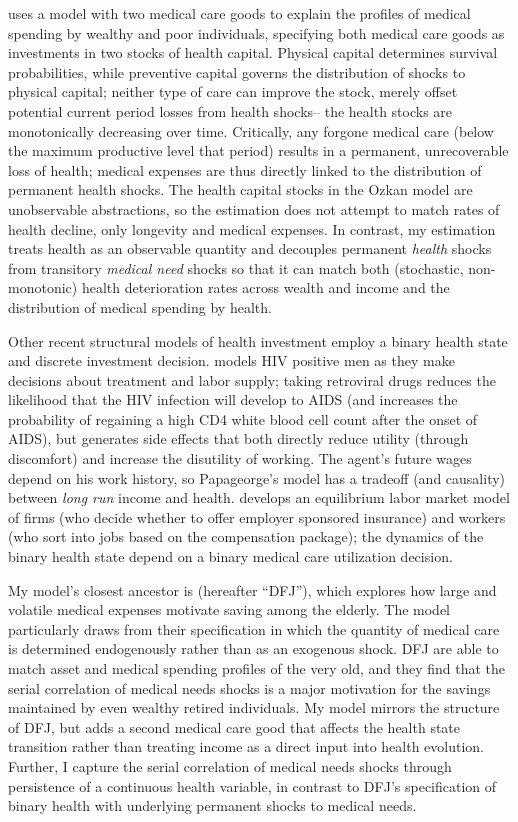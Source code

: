\documentclass[12pt,pdftex,letterpaper]{article}
\begin{document}
\cite{ozkan14} uses a model with two medical care goods to explain the profiles of medical spending by wealthy and poor individuals, specifying both medical care goods as investments in two stocks of health capital.  Physical capital determines survival probabilities, while preventive capital governs the distribution of shocks to physical capital; neither type of care can improve the stock, merely offset potential current period losses from health shocks-- the health stocks are monotonically decreasing over time. Critically, any forgone medical care (below the maximum productive level that period) results in a permanent, unrecoverable loss of health; medical expenses are thus directly linked to the distribution of permanent health shocks.   The health capital stocks in the Ozkan model are unobservable abstractions, so the estimation does not attempt to match rates of health decline, only longevity and medical expenses.  In contrast, my estimation treats health as an observable quantity and decouples permanent \textit{health} shocks from transitory \textit{medical need} shocks so that it can match both (stochastic, non-monotonic) health deterioration rates across wealth and income and the distribution of medical spending by health.

Other recent structural models of health investment employ a binary health state and discrete investment decision.  \cite{papageorge16} models HIV positive men as they make decisions about treatment and labor supply; taking retroviral drugs reduces the likelihood that the HIV infection will develop to AIDS (and increases the probability of regaining a high CD4 white blood cell count after the onset of AIDS), but generates side effects that both directly reduce utility (through discomfort) and increase the disutility of working.  The agent's future wages depend on his work history, so Papageorge's model has a tradeoff (and causality) between \textit{long run} income and health.  \cite{aizawa17} develops an equilibrium labor market model of firms (who decide whether to offer employer sponsored insurance) and workers (who sort into jobs based on the compensation package); the dynamics of the binary health state depend on a binary medical care utilization decision.

My model's closest ancestor is \cite{dinardi10} (hereafter ``DFJ''), which explores how large and volatile medical expenses motivate saving among the elderly.  The model particularly draws from their specification in which the quantity of medical care is determined endogenously rather than as an exogenous shock.  DFJ are able to match asset and medical spending profiles of the very old, and they find that the serial correlation of medical needs shocks is a major motivation for the savings maintained by even wealthy retired individuals.  My model mirrors the structure of DFJ, but adds a second medical care good that affects the health state transition rather than treating income as a direct input into health evolution.  Further, I capture the serial correlation of medical needs shocks through persistence of a continuous health variable, in contrast to DFJ's specification of binary health with underlying permanent shocks to medical needs.
\end{document}
